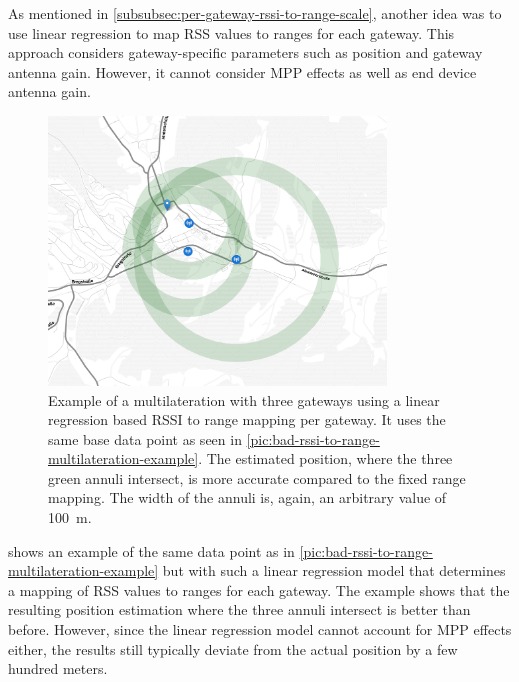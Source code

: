 As mentioned in \cref{subsubsec:per-gateway-rssi-to-range-scale}, another idea was to use linear regression to map \ac{RSS} values to ranges for each gateway.
This approach considers gateway-specific parameters such as position and gateway antenna gain.
However, it cannot consider \ac{MPP} effects as well as end device antenna gain.

\begin{figure}[htbp]
    \centering
    \includegraphics[width=0.8\textwidth]{pictures/ttn-locator/frontend/multilateration/rssi_range_multilateration_regression_example.png}
    \caption{
        Example of a multilateration with three gateways using a linear regression based \ac{RSSI} to range mapping per gateway.
        It uses the same base data point as seen in \cref{pic:bad-rssi-to-range-multilateration-example}.
        The estimated position, where the three green annuli intersect, is more accurate compared to the fixed range mapping.
        The width of the annuli is, again, an arbitrary value of \SI{100}{\meter}.
    }\label{pic:rssi-to-range-multilateration-example-with-linear-regression}
\end{figure}

 shows an example of the same data point as in \cref{pic:bad-rssi-to-range-multilateration-example} but with such a linear regression model that determines a mapping of \ac{RSS} values to ranges for each gateway.
The example shows that the resulting position estimation where the three annuli intersect is better than before.
However, since the linear regression model cannot account for \ac{MPP} effects either, the results still typically deviate from the actual position by a few hundred meters.

